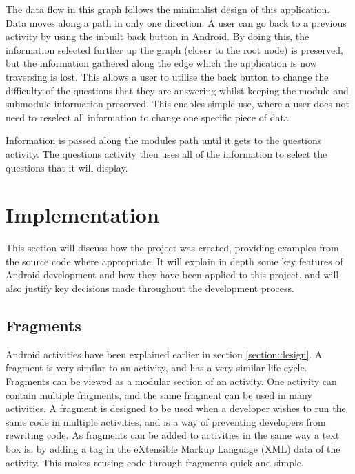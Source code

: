 \documentclass{article}
\begin{document}
The data flow in this graph follows the minimalist design of this application. Data moves along a path in only one direction. A user can go back to a previous activity by using the inbuilt back button in Android. By doing this, the information selected further up the graph (closer to the root node) is preserved, but the information gathered along the edge which the application is now traversing is lost. This allows a user to utilise the back button to change the difficulty of the questions that they are answering whilst keeping the module and submodule information preserved. This enables simple use, where a user does not need to reselect all information to change one specific piece of data. \par

Information is passed along the modules path until it gets to the questions activity. The questions activity then uses all of the information to select the questions that it will display. \par

\section{Implementation}
\label{section:implementation}

This section will discuss how the project was created, providing examples from the source code where appropriate. It will explain in depth some key features of Android development and how they have been applied to this project, and will also justify key decisions made throughout the development process. \par

\subsection{Fragments}

Android activities have been explained earlier in section \ref{section:design}. A fragment is very similar to an activity, and has a very similar life cycle. Fragments can be viewed as a modular section of an activity. One activity can contain multiple fragments, and the same fragment can be used in many activities. A fragment is designed to be used when a developer wishes to run the same code in multiple activities, and is a way of preventing developers from rewriting code. As fragments can be added to activities in the same way a text box is, by adding a tag in the eXtensible Markup Language (XML) data of the activity. This makes reusing code through fragments quick and simple. \par
\end{document}
